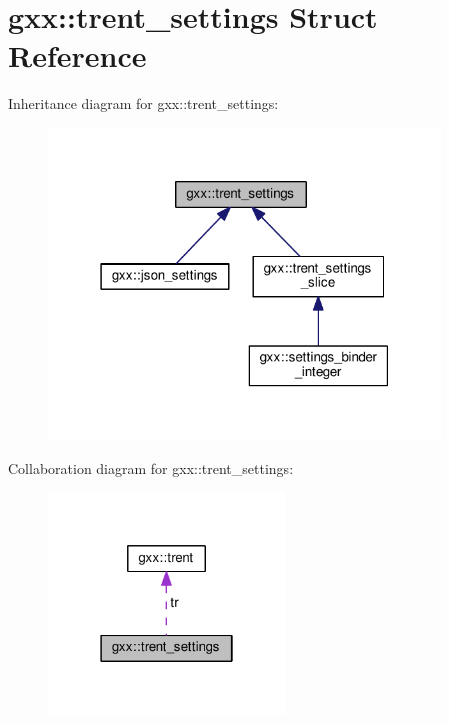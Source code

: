 \hypertarget{structgxx_1_1trent__settings}{}\section{gxx\+:\+:trent\+\_\+settings Struct Reference}
\label{structgxx_1_1trent__settings}


Inheritance diagram for gxx\+:\+:trent\+\_\+settings\+:
\nopagebreak
\begin{figure}[H]
\begin{center}
\leavevmode
\includegraphics[width=295pt]{structgxx_1_1trent__settings__inherit__graph}
\end{center}
\end{figure}


Collaboration diagram for gxx\+:\+:trent\+\_\+settings\+:
\nopagebreak
\begin{figure}[H]
\begin{center}
\leavevmode
\includegraphics[width=178pt]{structgxx_1_1trent__settings__coll__graph}
\end{center}
\end{figure}
